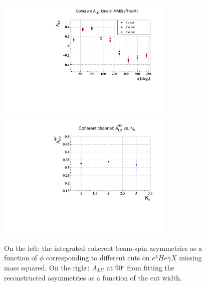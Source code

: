 \begin{enumerate}
\begin{enumerate}
\begin{enumerate}
    \begin{figure}[tbp]
    \includegraphics[height=6.0cm]{fig/ALU_coherent_MM2.pdf}
    \includegraphics[height=6.0cm]{fig/ALU_coherent_MM2_90deg.pdf}
    \caption{On the left: the integrated coherent beam-spin asymmetries as a 
    function of $\phi$ corresponding to different cuts on $e^{4}He\gamma X$ 
 missing mass squared. On the right: $A_{LU}$ at 90$^{\circ}$ from fitting the
  reconstructed asymmetries as a function of the cut width.}
    \label{fig:exc_coh-alu}
    \end{figure} 


\end{enumerate}
\end{enumerate}
\end{enumerate}
